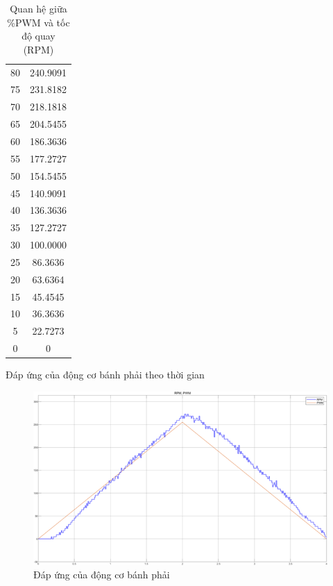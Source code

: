 \begin{table}[h!]
\begin{tabular}{|c|c|}
                         80 & 240.9091 \\
                         75 & 231.8182 \\
                         70 & 218.1818 \\
                         65 & 204.5455 \\
                         60 & 186.3636 \\
                         55 & 177.2727 \\
                         50 & 154.5455 \\
                         45 & 140.9091 \\
                         40 & 136.3636 \\
                         35 & 127.2727 \\
                         30 & 100.0000 \\
                         25 & 86.3636 \\
                         20 & 63.6364 \\
                         15 & 45.4545 \\
                         10 & 36.3636 \\
                         5 & 22.7273 \\
                         0 & 0 \\
                         \hline
                    \end{tabular}
                    \caption{Quan hệ giữa \%PWM và tốc độ quay (RPM)}
               \end{table}
               \newpage
               \hspace*{0.6cm}Đáp ứng của động cơ bánh phải theo thời gian
               \begin{figure}[H]
                    \centering
                    \includegraphics[width=1\textwidth]{pictures/chapter5/CJGB1_response.png}
                    \caption{Đáp ứng của động cơ bánh phải}
                    \label{CJGB1_response}
               \end{figure}  
